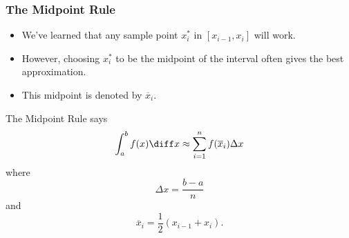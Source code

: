 \begin{frame}
\frametitle{The Midpoint Rule}
\begin{itemize}
\item  We've learned that any sample point $x_i^*$ in $[x_{i-1},x_i]$ will work.
\item  However, choosing $x_i^*$ to be the midpoint of the interval often gives the best approximation.
\item  This midpoint is denoted by $\overline{x}_i$.
\end{itemize}
The Midpoint Rule says
\[
\int_a^b f(x)\diff x \approx \sum_{i=1}^n f(\overline{x}_i)\Delta x
\]
where
\[
\Delta x = \frac{b-a}{n}
\]
and
\[
\overline{x}_i=\frac{1}{2}(x_{i-1}+x_i).
\]
\end{frame}
